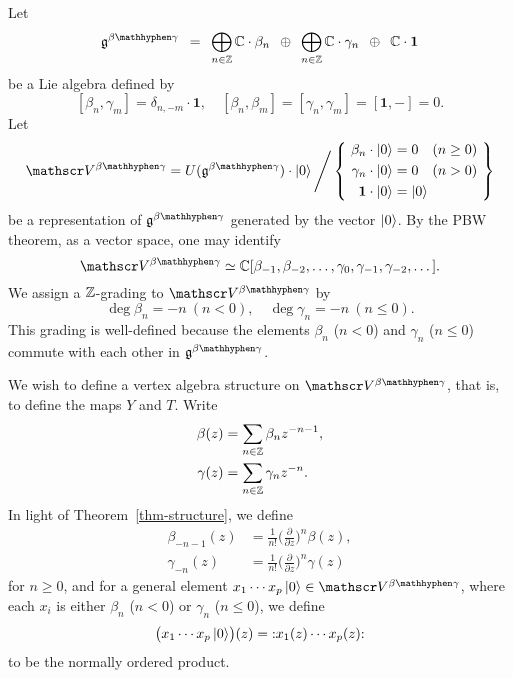 \begin{example} 
    \allowdisplaybreaks
    \label{eg-beta-gamma}
    Let 
    \[
        \frg^\betagamma \enspace = \enspace 
        \bigoplus_{n \in \bbZ} \bbC \cdot \beta_n
        \enspace \oplus \enspace \bigoplus_{n \in \bbZ} \bbC \cdot \gamma_n
        \enspace \oplus \enspace \bbC \cdot \mathbf{1}
    \]
    be a Lie algebra defined by
    \[
        [\beta_n, \gamma_m] = \delta_{n, -m} \cdot \mathbf{1}, \quad
        [\beta_n, \beta_m] = [\gamma_n, \gamma_m] = [\mathbf{1}, -] = 0.
    \]
    Let
    \[
        \scrV^\betagamma =
        U (\frg^\betagamma) \cdot \ket{0} \Bigg/
        \left\{ \ 
            \begin{aligned}
                \beta_n \cdot \ket{0} &= 0 \quad (n \geq 0) \\
                \gamma_n \cdot \ket{0} &= 0 \quad (n > 0) \\
                \mathbf{1} \cdot \ket{0} &= \ket{0}
            \end{aligned}
        \ \right\}
    \]
    be a representation of $\frg^\betagamma$
    generated by the vector $\mathinner{\mathopen{|}0\mathclose{\rangle}}$.
    By the PBW theorem,
    as a vector space, one may identify
    \[
        \scrV^\betagamma \simeq
        \bbC [
            \beta_{-1}, \beta_{-2}, \dotsc,
            \gamma_0, \gamma_{-1}, \gamma_{-2}, \dotsc
        ].
    \]
    We assign a $\mathbb{Z}$-grading to $\scrV^\betagamma$ by
    \[
        \deg \beta_{n} = -n \ (n < 0), \quad
        \deg \gamma_{n} = -n \ (n \leq 0).
    \]
    This grading is well-defined because the elements
    $\beta_n$ ($n < 0$) and $\gamma_n$ ($n \leq 0$)
    commute with each other in $\frg^\betagamma$.
    
    We wish to define a vertex algebra structure on $\scrV^\betagamma$,
    that is, to define the maps $Y$ and $T$. Write
    \begin{align*}
        \beta (z) &= \sum_{n \in \mathbb{Z}} \beta_n z^{-n - 1}, \\
        \gamma (z) &= \sum_{n \in \mathbb{Z}} \gamma_n z^{-n}.
    \end{align*}
    In light of Theorem~\ref{thm-structure},
    we define
    \begin{align*}
        \beta_{-n-1} (z) &=
        \frac{1}{n!}
        \biggl( \frac {\partial} {\partial z} \biggr)^n \beta (z), \\
        \gamma_{-n} (z) &=
        \frac{1}{n!}
        \biggl( \frac {\partial} {\partial z} \biggr)^n \gamma (z)
    \end{align*}
    for $n \geq 0$, and for a general element
    $x_1 \cdots x_p \ket{0} \in \scrV^\betagamma$,
    where each $x_i$ is either 
    $\beta_{n}$ ($n < 0$) or $\gamma_{n}$ ($n \leq 0$),
    we define
    \[
        \bigl( x_1 \cdots x_p \mathinner{\mathopen{|}0\mathclose{\rangle}} \bigr) (z) =
        \mathopen{:} x_1 (z) \cdots x_p (z) \mathclose{:}
    \]
    to be the normally ordered product.
    

\end{example}
